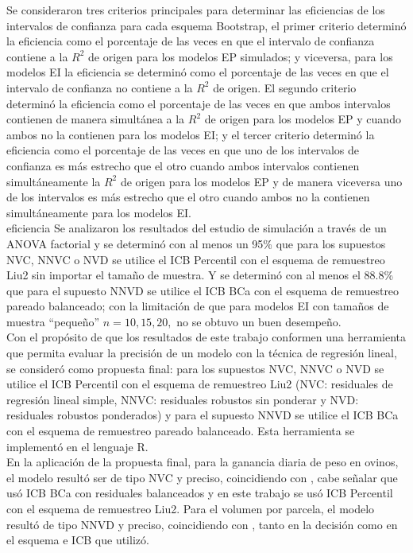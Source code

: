 Se consideraron tres criterios principales para determinar las eficiencias de los intervalos de confianza para cada esquema Bootstrap, el primer criterio determinó la eficiencia como el porcentaje de las veces en que el intervalo de confianza contiene a la $R^2$ de origen para los modelos EP simulados; y viceversa, para los modelos EI la eficiencia se determinó como el porcentaje de las veces en que el intervalo de confianza no contiene a la $R^2$ de origen. El segundo criterio determinó la eficiencia como el porcentaje de las veces en que ambos intervalos contienen de manera simultánea a la $R^2$ de origen para los modelos EP y cuando ambos no la contienen para los modelos EI; y el tercer criterio determinó la eficiencia como el porcentaje de las veces en que uno de los intervalos de confianza es más estrecho que el otro cuando ambos intervalos contienen simultáneamente la $R^2$ de origen para los modelos EP y de manera viceversa uno de los intervalos es más estrecho que el otro cuando ambos no la contienen simultáneamente para los modelos EI.\\
eficiencia
Se analizaron los resultados del estudio de simulación a través de un ANOVA factorial y se determinó con al menos un 95\% que para los supuestos NVC, NNVC o NVD se utilice el ICB Percentil con el esquema de remuestreo Liu2 sin importar el tamaño de muestra. Y se determinó con al menos el 88.8\% que para el supuesto NNVD se utilice el ICB BCa con el esquema de remuestreo pareado balanceado; con la limitación de que para modelos EI con tamaños de muestra “pequeño” $n=10, 15, 20,$ no se obtuvo un buen desempeño.\\


Con el propósito de que los resultados de este trabajo conformen una herramienta que permita evaluar la precisión de un modelo con la técnica de regresión lineal, se consideró como propuesta final: para los supuestos NVC, NNVC o NVD se utilice el ICB Percentil con el esquema de remuestreo Liu2 (NVC: residuales de regresión lineal simple, NNVC: residuales robustos sin ponderar y NVD: residuales robustos ponderados) y para el supuesto NNVD se utilice el ICB BCa con el esquema de remuestreo pareado balanceado. Esta herramienta se implementó en el lenguaje R.\\

En la aplicación de la propuesta final, para la ganancia diaria de peso en ovinos, el modelo resultó ser de tipo NVC y preciso, coincidiendo con \textcite{balam-2012}, cabe señalar que usó ICB BCa con residuales balanceados y en este trabajo se usó ICB Percentil con el esquema de remuestreo Liu2. Para el volumen por parcela, el modelo resultó de tipo NNVD y preciso, coincidiendo con \textcite{balam-2012}, tanto en la decisión como en el esquema e ICB que utilizó.\\


